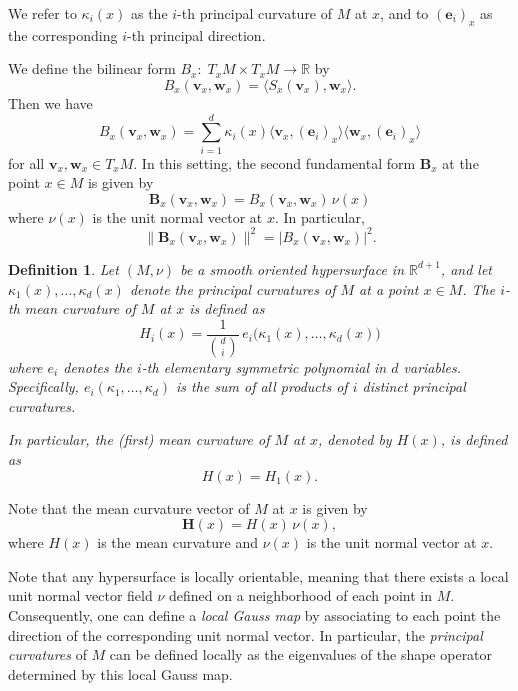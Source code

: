 \documentclass{amsart}
\theoremstyle{Theorem}
\newtheorem{defn}[theorem]{Definition}
\theoremstyle{remark}
\numberwithin{equation}{section} \numberwithin{figure}{section}
\renewcommand*{\to}{\rightarrow}
\begin{document}
We refer to \( \kappa_i(x) \) as the \( i \)-th principal curvature of \( M \) at \( x \), and to \( (\mathbf{e}_i)_x \) as the corresponding \( i \)-th principal direction.

We define the bilinear form
\(
B_x :\; T_x M \times T_x M \to \mathbb{R}
\)
by
\[
B_x(\mathbf{v}_x, \mathbf{w}_x) = \langle S_x(\mathbf{v}_x), \mathbf{w}_x \rangle.
\]
Then we have
\[
B_x(\mathbf{v}_x, \mathbf{w}_x) = \sum_{i=1}^{d} \kappa_i(x) \langle \mathbf{v}_x, (\mathbf{e}_i)_x \rangle \langle \mathbf{w}_x, (\mathbf{e}_i)_x \rangle
\]
for all \( \mathbf{v}_x, \mathbf{w}_x \in T_x M \). In this setting, the second fundamental form \( \mathbf{B}_x \) at the point \( x \in M \) is given by
\[
\mathbf{B}_x(\mathbf{v}_x, \mathbf{w}_x) = B_x(\mathbf{v}_x, \mathbf{w}_x) \, \nu(x)
\]
where \( \nu(x) \) is the unit normal vector at \( x \). In particular,
\[
\| \mathbf{B}_x(\mathbf{v}_x, \mathbf{w}_x) \|^2 = | B_x(\mathbf{v}_x, \mathbf{w}_x) |^2.
\]

\begin{defn}
Let \( (M, \nu) \) be a smooth oriented hypersurface in \( \mathbb{R}^{d+1} \), and let \( \kappa_1(x), \dots, \kappa_d(x) \) denote the principal curvatures of \( M \) at a point \( x \in M \). The \emph{\( i \)-th mean curvature} of \( M \) at \( x \) is defined as
\[
H_i(x) = \frac{1}{\binom{d}{i}} \, e_i\big(\kappa_1(x), \dots, \kappa_d(x)\big)
\]
where \( e_i \) denotes the \( i \)-th elementary symmetric polynomial in \( d \) variables. Specifically, \( e_i(\kappa_1, \dots, \kappa_d) \) is the sum of all products of \( i \) distinct principal curvatures.

In particular, the (first) \emph{mean curvature} of \( M \) at \( x \), denoted by \( H(x) \), is defined as
\[
H(x) = H_1(x).
\]
\end{defn}

Note that the mean curvature vector of \( M \) at \( x \) is given by
\[
\mathbf{H}(x) = H(x) \, \nu(x),
\]
where \( H(x) \) is the mean curvature and \( \nu(x) \) is the unit normal vector at \( x \).


Note that any hypersurface is locally orientable, meaning that there exists a local unit normal vector field \( \nu \) defined on a neighborhood of each point in \( M \). Consequently, one can define a \emph{local Gauss map} by associating to each point the direction of the corresponding unit normal vector. In particular, the \emph{principal curvatures} of \( M \) can be defined locally as the eigenvalues of the shape operator determined by this local Gauss map.
\end{document}
